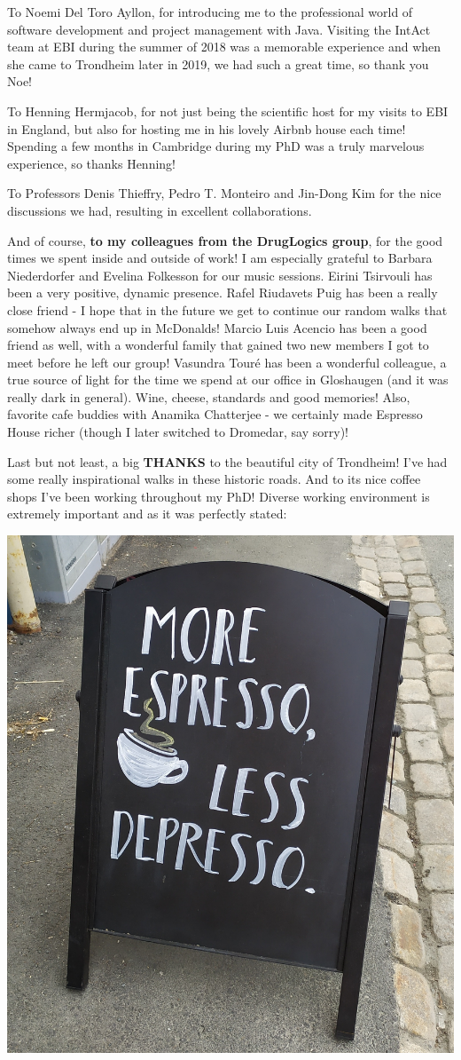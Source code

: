 \documentclass[
  12pt,
]{book}
\begin{document}
To Noemi Del Toro Ayllon, for introducing me to the professional world of software development and project management with Java. Visiting the IntAct team at EBI during the summer of 2018 was a memorable experience and when she came to Trondheim later in 2019, we had such a great time, so thank you Noe!

To Henning Hermjacob, for not just being the scientific host for my visits to EBI in England, but also for hosting me in his lovely Airbnb house each time! Spending a few months in Cambridge during my PhD was a truly marvelous experience, so thanks Henning!

To Professors Denis Thieffry, Pedro T. Monteiro and Jin-Dong Kim for the nice discussions we had, resulting in excellent collaborations.

And of course, \textbf{to my colleagues from the DrugLogics group}, for the good times we spent inside and outside of work! I am especially grateful to Barbara Niederdorfer and Evelina Folkesson for our music sessions. Eirini Tsirvouli has been a very positive, dynamic presence. Rafel Riudavets Puig has been a really close friend - I hope that in the future we get to continue our random walks that somehow always end up in McDonalds! Marcio Luis Acencio has been a good friend as well, with a wonderful family that gained two new members I got to meet before he left our group! Vasundra Touré has been a wonderful colleague, a true source of light for the time we spend at our office in Gloshaugen (and it was really dark in general). Wine, cheese, standards and good memories! Also, favorite cafe buddies with Anamika Chatterjee - we certainly made Espresso House richer (though I later switched to Dromedar, say sorry)!

Last but not least, a big \textbf{THANKS} to the beautiful city of Trondheim! I've had some really inspirational walks in these historic roads. And to its nice coffee shops I've been working throughout my PhD! Diverse working environment is extremely important and as it was perfectly stated:

\begin{center}\includegraphics[width=0.4\linewidth]{img/depresso} \end{center}
\end{document}
